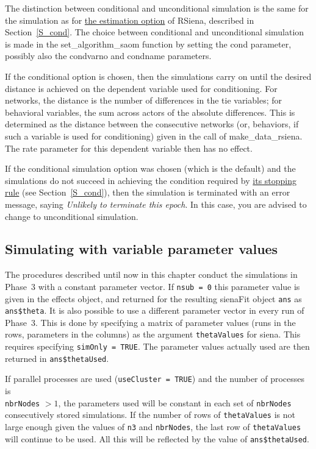 \documentclass[a4paper,fleqn,11pt]{article}
\newcommand{\+}{\, + \,}
\newcommand{\rs}{{\sf RSiena}}
\begin{document}
The distinction between conditional and unconditional simulation
is the same for the simulation as for
\hyperlink{T_S_cond}{the estimation option}
of \rs, described in Section~\ref{S_cond}.
The choice between conditional and
unconditional simulation is
made in the \textsf{set\_algorithm\_saom} function by setting the
\textsf{cond} parameter, possibly also the
\textsf{condvarno} and \textsf{condname} parameters.

If the conditional option is chosen, then the simulations
carry on until the desired distance is achieved on the dependent
variable used for conditioning.
For networks, the distance is the number of differences in the
tie variables; for behavioral variables, the sum
across actors of the absolute differences.
This is determined as the
distance between the consecutive networks (or, behaviors,
if such a variable is used for conditioning) given in the call of
\textsf{make\_data\_rsiena}.
The rate parameter for this dependent variable then
has no effect.

If the conditional simulation option was chosen (which is the
default) and the simulations do not succeed in achieving the
condition required by
\hyperlink{T_distance_stop}{its stopping rule}
(see Section~\ref{S_cond}), then the simulation is
terminated with an error message, saying
\emph{Unlikely to terminate this epoch}.
In this case, you are advised to change to unconditional simulation.


\subsection{Simulating with variable parameter values}

The procedures described until now in this chapter conduct the simulations
in Phase~3 with a constant parameter vector.
If \texttt{nsub = 0} this parameter value is given in the effects object,
and returned for the resulting \textsf{sienaFit} object \texttt{ans}
as \texttt{ans\$theta}.
It is also possible to use a different parameter vector in every
run of Phase~3. This is done by specifying a matrix of parameter
values (runs in the rows, parameters in the columns) as the
argument \texttt{thetaValues} for \textsf{siena}.
This requires specifying \texttt{simOnly = TRUE}.
The parameter values actually used are then returned
in \texttt{ans\$thetaUsed}.

If parallel processes are used (\texttt{useCluster = TRUE})
and the number of processes is \\
\texttt{nbrNodes} $ > 1$,
the parameters used will be constant in each set of \texttt{nbrNodes}
consecutively stored simulations.
If the number of rows of \texttt{thetaValues} is not large enough
given the values of \texttt{n3} and \texttt{nbrNodes},
the last row of \texttt{thetaValues} will continue to be used.
All this will be reflected by the value of \texttt{ans\$thetaUsed}.
\end{document}
